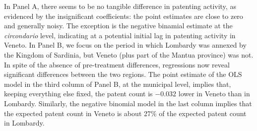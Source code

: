 \begin{center}
    
    
\end{center}



In Panel A, there seems to be no tangible difference in patenting activity, as evidenced by the insignificant coefficients: the point estimates are close to zero and generally noisy. 
The exception is the negative binamial estimate at the \textit{circondario} level, indicating at a potential initial lag in patenting activity in Veneto.   
In Panel B, we focus on the period in which Lombardy was annexed by the Kingdom of Sardinia, but Veneto (plus part of the Mantua province) was not. 
In spite of the absence of pre-treatment differences, regressions now reveal significant differences between the two regions. 
The point estimate of the OLS model in the third column of Panel B, at the municipal level, implies that, keeping everything else fixed, the patent count is $-0.032$ lower in Veneto than in Lombardy. 
Similarly, the negative binomial model in the last column implies that the expected patent count in Veneto is about 27\% of the expected patent count in Lombardy. 


